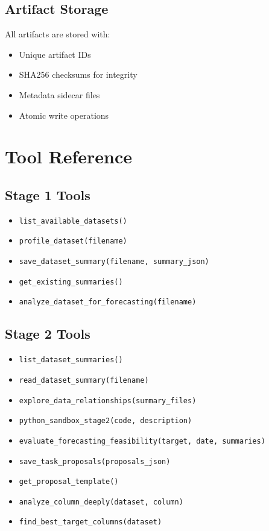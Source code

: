 \documentclass[12pt,a4paper]{report}
\begin{document}
\section{Artifact Storage}
All artifacts are stored with:
\begin{itemize}
    \item Unique artifact IDs
    \item SHA256 checksums for integrity
    \item Metadata sidecar files
    \item Atomic write operations
\end{itemize}

\appendix
\chapter{Tool Reference}

\section{Stage 1 Tools}
\begin{itemize}
    \item \texttt{list\_available\_datasets()}
    \item \texttt{profile\_dataset(filename)}
    \item \texttt{save\_dataset\_summary(filename, summary\_json)}
    \item \texttt{get\_existing\_summaries()}
    \item \texttt{analyze\_dataset\_for\_forecasting(filename)}
\end{itemize}

\section{Stage 2 Tools}
\begin{itemize}
    \item \texttt{list\_dataset\_summaries()}
    \item \texttt{read\_dataset\_summary(filename)}
    \item \texttt{explore\_data\_relationships(summary\_files)}
    \item \texttt{python\_sandbox\_stage2(code, description)}
    \item \texttt{evaluate\_forecasting\_feasibility(target, date, summaries)}
    \item \texttt{save\_task\_proposals(proposals\_json)}
    \item \texttt{get\_proposal\_template()}
    \item \texttt{analyze\_column\_deeply(dataset, column)}
    \item \texttt{find\_best\_target\_columns(dataset)}
\end{itemize}
\end{document}

